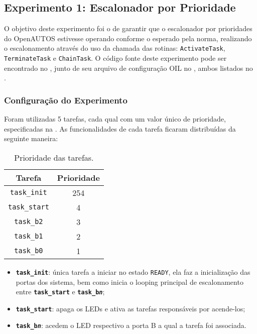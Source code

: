 \subsection{Experimento 1: Escalonador por Prioridade} \label{cap:cap5_scheduler_p}

O objetivo deste experimento foi o de garantir que o escalonador por prioridades do OpenAUTOS estivesse operando conforme o esperado pela norma, realizando o escalonamento através do uso da chamada das rotinas: \texttt{ActivateTask}, \texttt{TerminateTask} e \texttt{ChainTask}. O código fonte deste experimento pode ser encontrado no , junto de seu arquivo de configuração OIL no , ambos listados no .

\subsubsection{Configuração do Experimento}

Foram utilizadas 5 tarefas, cada qual com um valor único de prioridade, especificadas na . As funcionalidades de cada tarefa ficaram distribuídas da seguinte maneira:

\begin{table}[h]
	\centering
	\caption{Prioridade das tarefas.}
	\label{tab:cap5_scheduler_p}
	\begin{tabular}{cc}
		Tarefa               & Prioridade \\ \hline \hline
		\texttt{task\_init}  & 254        \\ \hline
		\texttt{task\_start} & 4          \\ \hline
		\texttt{task\_b2}    & 3          \\ \hline
		\texttt{task\_b1}    & 2          \\ \hline
		\texttt{task\_b0}    & 1          \\ \hline
	\end{tabular}
\end{table}

\begin{itemize}
	\item \textbf{\texttt{task\_init}}: única tarefa a iniciar no estado \texttt{READY}, ela faz a inicialização das portas dos sistema, bem como inicia o looping principal de escalonamento entre \textbf{\texttt{task\_start}} e \textbf{\texttt{task\_b\textit{n}}};
	\item \textbf{\texttt{task\_start}}: apaga os LEDs e ativa as tarefas responsáveis por acende-los;
	\item \textbf{\texttt{task\_b\textit{n}}}: acedem o LED respectivo a porta B a qual a tarefa foi associada.
\end{itemize}

